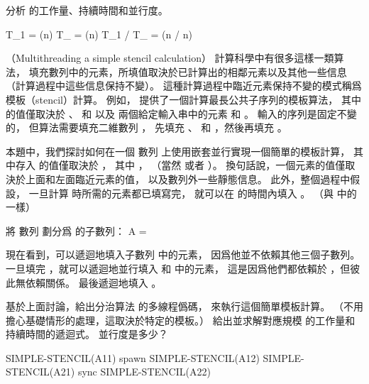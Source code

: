 \stopANSWER

\startigBase[continue]\startitem
分析  的工作量、持續時間和並行度。
\stopitem\stopigBase

\startANSWER
\startformula\startmathalignment
\NC T_1 \NC = \Theta(n) \NR
\NC T_{\infty} \NC = \Theta(\lg n) \NR
\NC T_1 / T_{\infty} \NC = \Theta(n / \lg n) \NR
\stopmathalignment\stopformula
\stopANSWER

\stopPROBLEM

\startPROBLEM
（Multithreading a simple stencil calculation）
計算科學中有很多這樣一類算法，
填充數列中的元素，所填值取決於已計算出的相鄰元素以及其他一些信息
（計算過程中這些信息保持不變）。
這種計算過程中臨近元素保持不變的模式稱爲{\EMP 模板（stencil）}計算。
例如， 提供了一個計算最長公共子序列的模板算法，
其中  的值僅取決於 、  和  以及
兩個給定輸入串中的元素  和 。
輸入的序列是固定不變的，
但算法需要填充二維數列 ，
先填充 、  和 ，然後再填充 。

本題中，我們探討如何在一個  數列  上使用嵌套並行實現一個簡單的模板計算，
其中存入  的值僅取決於 ，
其中 ，  （當然  或者 ）。
換句話說，一個元素的值僅取決於上面和左面臨近元素的值，
以及數列外一些靜態信息。
此外，整個過程中假設，
一旦計算  時所需的元素都已填寫完，
就可以在  的時間內填入 。
（與 中的  一樣）

將  數列  劃分爲  的子數列：
\startformula
A = 
\stopformula

現在看到，可以遞迴地填入子數列  中的元素，
因爲他並不依賴其他三個子數列。
一旦填完 ，就可以遞迴地並行填入  和  中的元素，
這是因爲他們都依賴於 ，但彼此無依賴關係。
最後遞迴地填入 。

\startigBase[a]\startitem
基於上面討論，給出分治算法  的多線程僞碼，
來執行這個簡單模板計算。
（不用擔心基礎情形的處理，這取決於特定的模板。）
給出並求解對應規模  的工作量和持續時間的遞迴式。
並行度是多少？
\stopitem\stopigBase

\startANSWER
{}
\startCLRS
SIMPLE-STENCIL(A11)
spawn SIMPLE-STENCIL(A12)
SIMPLE-STENCIL(A21)
sync
SIMPLE-STENCIL(A22)
\stopCLRS

